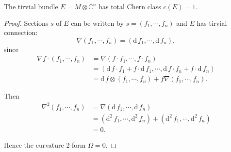 \documentclass[11pt]{homework}
\theoremstyle{indented}
\begin{document}
\begin{proposition}
    The tirvial bundle $E = M\otimes \mathbb{C}^n$ has total Chern class $c(E) = 1$.
\end{proposition}
\begin{proof}
    Sections $s$ of $E$ can be written by $s = (f_1, \cdots, f_n)$ and $E$ has tirvial connection:
    \begin{equation*}
        \nabla (f_1, \cdots, f_n) = (\mathrm{d}\, f_1, \cdots, \mathrm{d}\, f_n),
    \end{equation*}
    since
    \begin{align*}
        \nabla f\cdot (f_1, \cdots, f_n) &= \nabla (f\cdot f_1, \cdots, f\cdot f_n) \\
        &= (\mathrm{d}\, f\cdot f_1 + f\cdot  \mathrm{d}\, f_1, \cdots, \mathrm{d}\, f\cdot f_n +f\cdot \mathrm{d}\, f_n) \\
        &= \mathrm{d}\, f \otimes (f_1, \cdots, f_n) + f \nabla (f_1, \cdots, f_n).
    \end{align*}

    Then 
    \begin{align*}
        \nabla^2 (f_1, \cdots, f_n) &= \nabla (\mathrm{d}\, f_1, \cdots, \mathrm{d}\, f_n) \\
        &= (\mathrm{d}^2\, f_1, \cdots, \mathrm{d}^2\, f_n) + (\mathrm{d}^2\, f_1, \cdots, \mathrm{d}^2\, f_n) \\
        &= 0.
    \end{align*}

    Hence the curvature 2-form $\Omega = 0$.
\end{proof}
\end{document}
